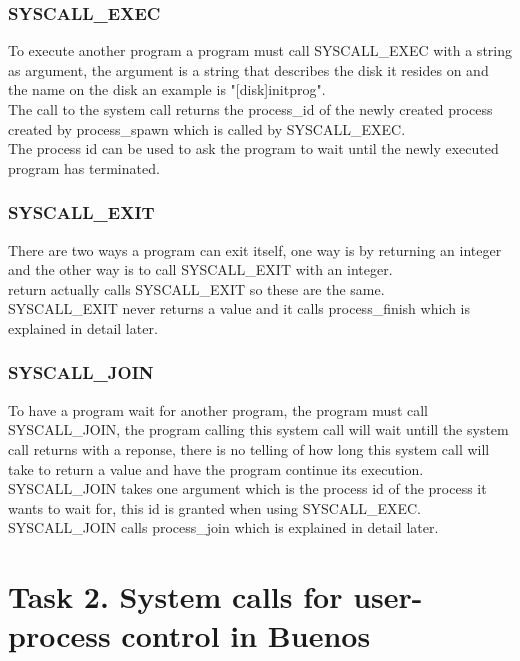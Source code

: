 \documentclass[a4paper,12pt,danish]{report}
\begin{document}
\subsubsection{SYSCALL\_EXEC}
To execute another program a program must call SYSCALL\_EXEC with a string as argument, the argument is a string that describes the disk it resides on and the name on the disk an example is "[disk]initprog".
\\
The call to the system call returns the process\_id of the newly created process created by process\_spawn which is called by SYSCALL\_EXEC.
\\
The process id can be used to ask the program to wait until the newly executed program has terminated.
\subsubsection{SYSCALL\_EXIT}
There are two ways a program can exit itself, one way is by returning an integer and the other way is to call SYSCALL\_EXIT with an integer.
\\
return actually calls SYSCALL\_EXIT so these are the same.
\\
SYSCALL\_EXIT never returns a value and it calls process\_finish which is explained in detail later.
\subsubsection{SYSCALL\_JOIN}
To have a program wait for another program, the program must call SYSCALL\_JOIN, the program calling this system call will wait untill the system call returns with a reponse, there is no telling of how long this system call will take to return a value and have the program continue its execution.
\\
SYSCALL\_JOIN takes one argument which is the process id of the process it wants to wait for, this id is granted when using SYSCALL\_EXEC.
\\
SYSCALL\_JOIN calls process\_join which is explained in detail later. 
\newpage
\section{Task 2. System calls for user-process control in Buenos}
\end{document}
